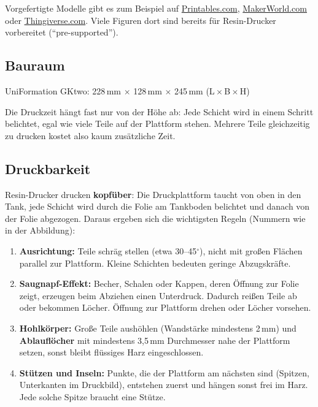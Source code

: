 \documentclass{\basedir/fablab-document}
\begin{document}
Vorgefertigte Modelle gibt es zum Beispiel auf \href{https://www.printables.com}{Printables.com}, \href{https://makerworld.com}{MakerWorld.com} oder \href{https://www.thingiverse.com}{Thingiverse.com}. Viele Figuren dort sind bereits für Resin-Drucker vorbereitet (\enquote{pre-supported}).

\subsection{Bauraum}

UniFormation GKtwo: 228\,mm $\times$ 128\,mm $\times$ 245\,mm (L\,$\times$\,B\,$\times$\,H)

Die Druckzeit hängt fast nur von der Höhe ab: Jede Schicht wird in einem Schritt belichtet, egal wie viele Teile auf der Plattform stehen. Mehrere Teile gleichzeitig zu drucken kostet also kaum zusätzliche Zeit.

\subsection{Druckbarkeit}\label{sec:druckbarkeit}

Resin-Drucker drucken \textbf{kopfüber}: Die Druckplattform taucht von oben in den Tank, jede Schicht wird durch die Folie am Tankboden belichtet und danach von der Folie abgezogen. Daraus ergeben sich die wichtigsten Regeln (Nummern wie in der Abbildung):

\begin{enumerate}
	\item \textbf{Ausrichtung:} Teile schräg stellen (etwa 30--45$^\circ$), nicht mit großen Flächen parallel zur Plattform. Kleine Schichten bedeuten geringe Abzugskräfte.
	\item \textbf{Saugnapf-Effekt:} Becher, Schalen oder Kappen, deren Öffnung zur Folie zeigt, erzeugen beim Abziehen einen Unterdruck. Dadurch reißen Teile ab oder bekommen Löcher. Öffnung zur Plattform drehen oder Löcher vorsehen.
	\item \textbf{Hohlkörper:} Große Teile aushöhlen (Wandstärke mindestens 2\,mm) und \textbf{Ablauflöcher} mit mindestens 3,5\,mm Durchmesser nahe der Plattform setzen, sonst bleibt flüssiges Harz eingeschlossen.
	\item \textbf{Stützen und Inseln:} Punkte, die der Plattform am nächsten sind (Spitzen, Unterkanten im Druckbild), entstehen zuerst und hängen sonst frei im Harz. Jede solche Spitze braucht eine Stütze.
\end{enumerate}
\end{document}
